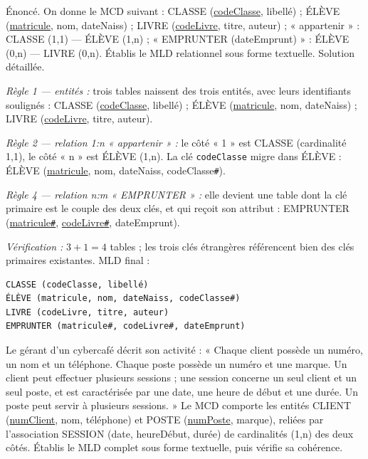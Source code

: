 \documentclass[11pt]{article}
\begin{document}
\begin{exoresolu}
Énoncé. On donne le MCD suivant : CLASSE (\underline{codeClasse}, libellé) ; ÉLÈVE (\underline{matricule}, nom, dateNaiss) ; LIVRE (\underline{codeLivre}, titre, auteur) ; « appartenir » : CLASSE (1,1) --- ÉLÈVE (1,n) ; « EMPRUNTER (dateEmprunt) » : ÉLÈVE (0,n) --- LIVRE (0,n). Établis le MLD relationnel sous forme textuelle.
\tcblower
Solution détaillée.

\emph{Règle 1 --- entités :} trois tables naissent des trois entités, avec leurs identifiants soulignés :
CLASSE (\underline{codeClasse}, libellé) ; ÉLÈVE (\underline{matricule}, nom, dateNaiss) ; LIVRE (\underline{codeLivre}, titre, auteur).

\emph{Règle 2 --- relation 1:n « appartenir » :} le côté « 1 » est CLASSE (cardinalité 1,1), le côté « n » est ÉLÈVE (1,n). La clé \texttt{codeClasse} migre dans ÉLÈVE :
ÉLÈVE (\underline{matricule}, nom, dateNaiss, codeClasse\texttt{\#}).

\emph{Règle 4 --- relation n:m « EMPRUNTER » :} elle devient une table dont la clé primaire est le couple des deux clés, et qui reçoit son attribut :
EMPRUNTER (\underline{matricule\texttt{\#}}, \underline{codeLivre\texttt{\#}}, dateEmprunt).

\emph{Vérification :} $3 + 1 = 4$ tables ; les trois clés étrangères référencent bien des clés primaires existantes. MLD final :
\begin{center}
\begin{lstlisting}
CLASSE (codeClasse, libellé)
ÉLÈVE (matricule, nom, dateNaiss, codeClasse#)
LIVRE (codeLivre, titre, auteur)
EMPRUNTER (matricule#, codeLivre#, dateEmprunt)
\end{lstlisting}
\end{center}
\end{exoresolu}

\begin{exercice}
Le gérant d'un cybercafé décrit son activité : « Chaque client possède un numéro, un nom et un téléphone. Chaque poste possède un numéro et une marque. Un client peut effectuer plusieurs sessions ; une session concerne un seul client et un seul poste, et est caractérisée par une date, une heure de début et une durée. Un poste peut servir à plusieurs sessions. » Le MCD comporte les entités CLIENT (\underline{numClient}, nom, téléphone) et POSTE (\underline{numPoste}, marque), reliées par l'association SESSION (date, heureDébut, durée) de cardinalités (1,n) des deux côtés. Établis le MLD complet sous forme textuelle, puis vérifie sa cohérence.
\end{exercice}
\end{document}

